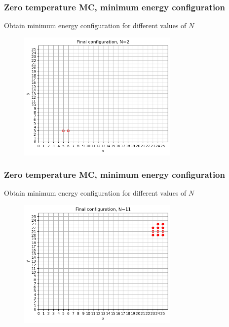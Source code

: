 \documentclass{beamer}
\begin{document}
\begin{frame}
    \frametitle{Zero temperature MC, minimum energy configuration}

    \centering Obtain minimum energy configuration for different values of $N$

    \begin{figure}
        \includegraphics[width=0.7\textwidth]{images/finconf2b.png}
    \end{figure}

\end{frame}

\begin{frame}
    \frametitle{Zero temperature MC, minimum energy configuration}

    \centering Obtain minimum energy configuration for different values of $N$

    \begin{figure}
        \includegraphics[width=0.7\textwidth]{images/finconf11b.png}
    \end{figure}

\end{frame}
\end{document}
